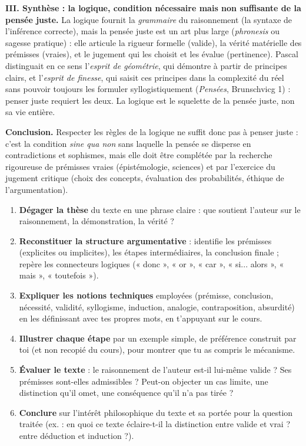 \documentclass[11pt]{article}
\begin{document}
\begin{exoresolu}
\textbf{III. Synthèse : la logique, condition nécessaire mais non suffisante de la pensée juste.}
La logique fournit la \emph{grammaire} du raisonnement (la syntaxe de l'inférence correcte), mais la pensée juste est un art plus large (\emph{phronesis} ou sagesse pratique) : elle articule la rigueur formelle (valide), la vérité matérielle des prémisses (vraies), et le jugement qui les choisit et les évalue (pertinence). Pascal distinguait en ce sens l'\emph{esprit de géométrie}, qui démontre à partir de principes clairs, et l'\emph{esprit de finesse}, qui saisit ces principes dans la complexité du réel sans pouvoir toujours les formuler syllogistiquement (\emph{Pensées}, Brunschvicg 1) : penser juste requiert les deux. La logique est le squelette de la pensée juste, non sa vie entière.

\textbf{Conclusion.} Respecter les règles de la logique ne suffit donc pas à penser juste : c'est la condition \emph{sine qua non} sans laquelle la pensée se disperse en contradictions et sophismes, mais elle doit être complétée par la recherche rigoureuse de prémisses vraies (épistémologie, sciences) et par l'exercice du jugement critique (choix des concepts, évaluation des probabilités, éthique de l'argumentation).
\end{exoresolu}

\begin{methode}
\begin{enumerate}
\item \textbf{Dégager la thèse} du texte en une phrase claire : que soutient l'auteur sur le raisonnement, la démonstration, la vérité ?
\item \textbf{Reconstituer la structure argumentative} : identifie les prémisses (explicites ou implicites), les étapes intermédiaires, la conclusion finale ; repère les connecteurs logiques (« donc », « or », « car », « si... alors », « mais », « toutefois »).
\item \textbf{Expliquer les notions techniques} employées (prémisse, conclusion, nécessité, validité, syllogisme, induction, analogie, contraposition, absurdité) en les définissant avec tes propres mots, en t'appuyant sur le cours.
\item \textbf{Illustrer chaque étape} par un exemple simple, de préférence construit par toi (et non recopié du cours), pour montrer que tu as compris le mécanisme.
\item \textbf{Évaluer le texte} : le raisonnement de l'auteur est-il lui-même valide ? Ses prémisses sont-elles admissibles ? Peut-on objecter un cas limite, une distinction qu'il omet, une conséquence qu'il n'a pas tirée ?
\item \textbf{Conclure} sur l'intérêt philosophique du texte et sa portée pour la question traitée (ex. : en quoi ce texte éclaire-t-il la distinction entre valide et vrai ? entre déduction et induction ?).
\end{enumerate}
\end{methode}
\end{document}
